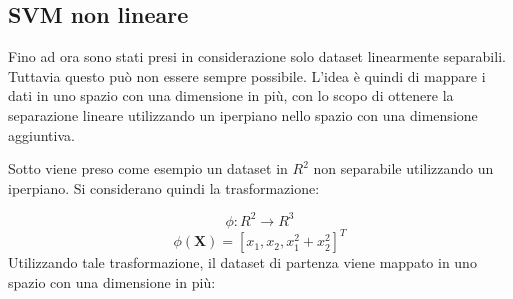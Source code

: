 \documentclass[oneside]{book}
\begin{document}
\subsection{SVM non lineare}
Fino ad ora sono stati presi in considerazione solo dataset linearmente separabili. Tuttavia questo può non essere sempre possibile. L'idea è quindi di mappare i dati in uno spazio con una dimensione in più, con lo scopo di ottenere la separazione lineare utilizzando un iperpiano nello spazio con una dimensione aggiuntiva.

Sotto viene preso come esempio un dataset in $R^2$ non separabile utilizzando un iperpiano. Si considerano quindi la trasformazione:


$$\phi \colon R^2 \to R^3$$
$$\phi(\boldsymbol{X})  = [x_1, x_2, x_1^2 + x_2^2]^T$$ 
Utilizzando tale trasformazione, il dataset di partenza viene mappato in uno spazio con una dimensione in più:
\end{document}
